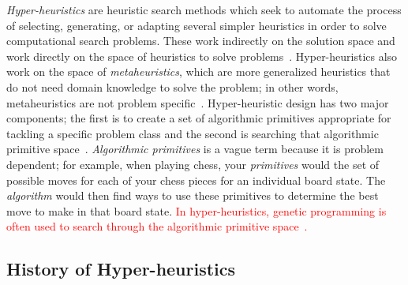 \documentclass{sig-alternate}
\begin{document}
\textit{Hyper-heuristics} are heuristic search methods which seek to automate the process of selecting, generating, or adapting several simpler heuristics in order to solve computational search problems. These work indirectly on the solution space and work directly on the space of heuristics to solve problems~\cite{tauritz:tutorial}. Hyper-heuristics also work on the space of \textit{metaheuristics}, which are more generalized heuristics that do not need domain knowledge to solve the problem; in other words, metaheuristics are not problem specific~\cite{tauritz:tutorial}. Hyper-heuristic design has two major components; the first is to create a set of algorithmic primitives appropriate for tackling a specific problem class and the second is searching that algorithmic primitive space~\cite{harris:2015}. \textit{Algorithmic primitives} is a vague term because it is problem dependent; for example, when playing chess, your \textit{primitives} would the set of possible moves for each of your chess pieces for an individual board state. The \textit{algorithm} would then find ways to use these primitives to determine the best move to make in that board state. \textcolor{red}{In hyper-heuristics, genetic programming is often used to search through the algorithmic primitive space~\cite{harris:2015}.}

\subsection{History of Hyper-heuristics}
\label{sec:history}
\end{document}
